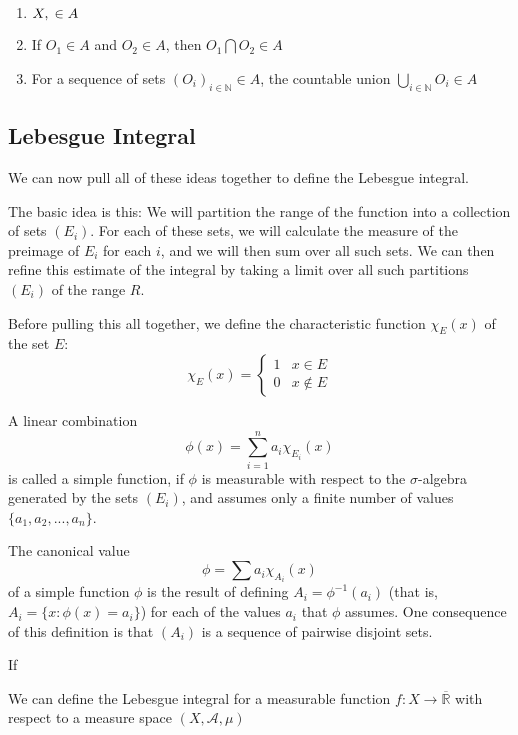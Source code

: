 \documentclass{article}
\begin{document}
\begin{enumerate}
\item $X, \null \in A$
\item If $O_1 \in A$ and $O_2 \in A$, then $O_1 \bigcap O_2 \in A$
\item For a sequence of sets $\left(O_i\right)_{i\in \mathbb{N}} \in A$, the countable
	union $\bigcup_{i\in \mathbb{N}} O_i \in A$
\end{enumerate}

\subsection{Lebesgue Integral}

We can now pull all of these ideas together to define the Lebesgue integral.

The basic idea is this: We will partition the range of the function into a collection
of sets $(E_i)$. For each of these sets, we will calculate the measure of the preimage of 
$E_i$ for each $i$, and we will then sum over all such sets. We can then refine this
estimate of the integral by taking a limit over all such partitions $(E_i)$ of the range
$R$.

Before pulling this all together, we define the characteristic function $\chi_E(x)$ of
the set $E$:
\[ \chi_E(x)=\left\{ 
\begin{array}{ll}
1 & x \in E\\
0 & x \notin E
\end{array} \right.
\]

A linear combination
\[ \phi(x) = \sum_{i=1}^{n}a_i\chi_{E_i}(x) \]
is called a simple function, if $\phi$ is measurable with respect to the $\sigma$-algebra
generated by the sets $(E_i)$, and assumes only a finite number of values
$\{a_1,a_2,...,a_n\}$. 

The canonical value 
\[\phi = \sum a_i \chi_{A_i}(x) \]
of a simple function $\phi$ is the result of defining $A_i = \phi^{-1}(a_i)$ (that is,
$A_i = \{x:\phi(x)=a_i\}$) for each of the values $a_i$ that $\phi$ assumes. One consequence
of this definition is that $\left(A_i\right)$ is a sequence of pairwise disjoint sets.

If 

We can define the Lebesgue integral for a measurable function $f:X \rightarrow 
\overline{\mathbb{R}}$ with respect to a measure space $(X, \mathcal{A},\mu)$
\end{document}
